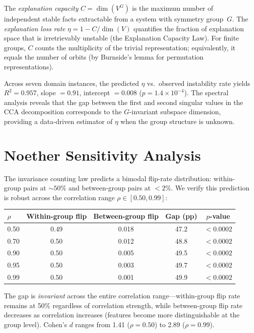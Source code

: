 \documentclass[11pt]{article}
\begin{document}
The \emph{explanation capacity} $C = \dim(V^G)$ is the maximum number of independent stable facts extractable from a system with symmetry group~$G$.  The \emph{explanation loss rate} $\eta = 1 - C/\dim(V)$ quantifies the fraction of explanation space that is irretrievably unstable (the Explanation Capacity Law).  For finite groups, $C$ counts the multiplicity of the trivial representation; equivalently, it equals the number of orbits (by Burnside's lemma for permutation representations).

Across seven domain instances, the predicted $\eta$ vs.\ observed instability rate yields $R^2 = 0.957$, slope $= 0.91$, intercept $= 0.008$ ($p = 1.4 \times 10^{-4}$).  The spectral analysis reveals that the gap between the first and second singular values in the CCA decomposition corresponds to the $G$-invariant subspace dimension, providing a data-driven estimator of $\eta$ when the group structure is unknown.

\section{Noether Sensitivity Analysis}

The invariance counting law predicts a bimodal flip-rate distribution: within-group pairs at ${\sim}50\%$ and between-group pairs at $<2\%$.  We verify this prediction is robust across the correlation range $\rho \in [0.50, 0.99]$:

\begin{center}
\small
\begin{tabular}{lcccc}
\toprule
$\rho$ & Within-group flip & Between-group flip & Gap (pp) & $p$-value \\
\midrule
0.50 & 0.49 & 0.018 & 47.2 & $<0.0002$ \\
0.70 & 0.50 & 0.012 & 48.8 & $<0.0002$ \\
0.90 & 0.50 & 0.005 & 49.5 & $<0.0002$ \\
0.95 & 0.50 & 0.003 & 49.7 & $<0.0002$ \\
0.99 & 0.50 & 0.001 & 49.9 & $<0.0002$ \\
\bottomrule
\end{tabular}
\end{center}

The gap is \emph{invariant} across the entire correlation range---within-group flip rate remains at 50\% regardless of correlation strength, while between-group flip rate decreases as correlation increases (features become more distinguishable at the group level).  Cohen's $d$ ranges from 1.41 ($\rho = 0.50$) to 2.89 ($\rho = 0.99$).
\end{document}
